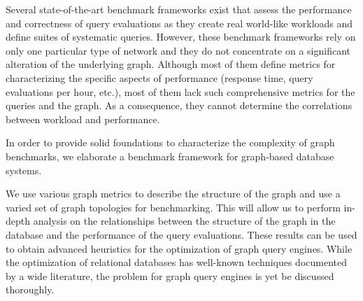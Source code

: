 Several state-of-the-art benchmark frameworks exist that assess the performance and correctness of query evaluations as they create real world-like workloads and define suites of systematic queries. However, these benchmark frameworks rely on only one particular type of network and they do not concentrate on a significant alteration of the underlying graph. Although most of them define metrics for characterizing the specific aspects of performance (response time, query evaluations per hour, etc.), most of them lack such comprehensive metrics for the queries and the graph.
As a consequence, they cannot determine the correlations between workload and performance.


In order to provide solid foundations to characterize the complexity of graph benchmarks, we elaborate a benchmark framework for graph-based database systems.

We use various graph metrics to describe the structure of the graph %
and use a varied set of graph topologies for benchmarking. This will allow us to perform in-depth analysis on the relationships between the structure of the graph in the database and the performance of the query evaluations. These results can be used to obtain advanced heuristics for the optimization of graph query engines. While the optimization of relational databases has well-known techniques documented by a wide literature, the problem for graph query engines is yet be discussed thoroughly.







